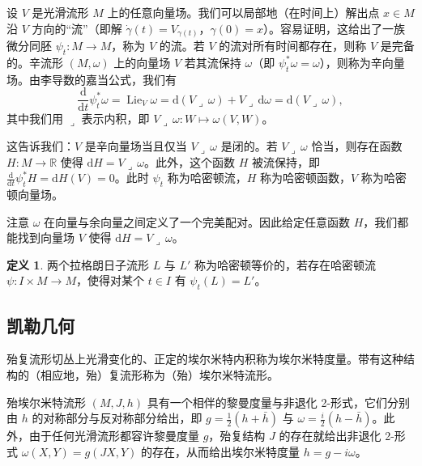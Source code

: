 \documentclass[11pt,a4paper]{article}
\theoremstyle{plain}
\theoremstyle{definition}
\newtheorem{definition}[theorem]{定义}
\begin{document}
设 $V$ 是光滑流形 $M$ 上的任意向量场。我们可以局部地（在时间上）解出点 $x\in M$ 沿 $V$ 方向的“流”（即解 $\dot\gamma(t)=V_{\gamma(t)}$，$\gamma(0)=x$）。容易证明，这给出了一族微分同胚 $\psi_t\colon M\to M$，称为 $V$ 的流。若 $V$ 的流对所有时间都存在，则称 $V$ 是完备的。辛流形 $(M,\omega)$ 上的向量场 $V$ 若其流保持 $\omega$（即 $\psi_t^*\omega=\omega$），则称为辛向量场。由李导数的嘉当公式，我们有
\[
\frac{\mathrm{d}}{\mathrm{d}t}\psi_t^*\omega=\operatorname{Lie}_V\omega=\mathrm{d}(V\lrcorner\,\omega)+V\lrcorner\,\mathrm{d}\omega=\mathrm{d}(V\lrcorner\,\omega),
\]
其中我们用 $\lrcorner$ 表示内积，即 $V\lrcorner\,\omega\colon W\mapsto\omega(V,W)$。


这告诉我们：$V$ 是辛向量场当且仅当 $V\lrcorner\,\omega$ 是闭的。若 $V\lrcorner\,\omega$ 恰当，则存在函数 $H\colon M\to\mathbb{R}$ 使得 $\mathrm{d}H=V\lrcorner\,\omega$。此外，这个函数 $H$ 被流保持，即 $\frac{\mathrm{d}}{\mathrm{d}t}\psi_t^*H=\mathrm{d}H(V)=0$。此时 $\psi_t$ 称为哈密顿流，$H$ 称为哈密顿函数，$V$ 称为哈密顿向量场。

注意 $\omega$ 在向量与余向量之间定义了一个完美配对。因此给定任意函数 $H$，我们都能找到向量场 $V$ 使得 $\mathrm{d}H=V\lrcorner\,\omega$。

\begin{definition}
两个拉格朗日子流形 $L$ 与 $L'$ 称为哈密顿等价的，若存在哈密顿流 $\psi\colon I\times M\to M$，使得对某个 $t\in I$ 有 $\psi_t(L)=L'$。
\end{definition}

\subsection{凯勒几何}

殆复流形切丛上光滑变化的、正定的埃尔米特内积称为埃尔米特度量。带有这种结构的（相应地，殆）复流形称为（殆）埃尔米特流形。

殆埃尔米特流形 $(M,J,h)$ 具有一个相伴的黎曼度量与非退化 2-形式，它们分别由 $h$ 的对称部分与反对称部分给出，即 $g=\frac{1}{2}(h+\bar h)$ 与 $\omega=\frac{i}{2}(h-\bar h)$。此外，由于任何光滑流形都容许黎曼度量 $g$，殆复结构 $J$ 的存在就给出非退化 2-形式 $\omega(X,Y)=g(JX,Y)$ 的存在，从而给出埃尔米特度量 $h=g-i\omega$。
\end{document}
